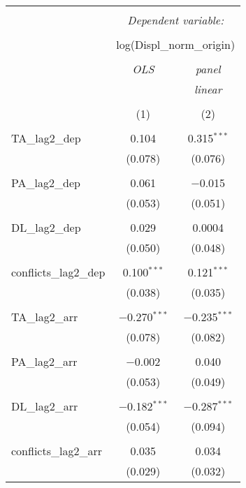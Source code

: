 
\begin{table}[!htbp] \centering 
  \caption{} 
  \label{} 
\begin{tabular}{@{\extracolsep{5pt}}lcc} 
\\[-1.8ex]\hline 
\hline \\[-1.8ex] 
 & \multicolumn{2}{c}{\textit{Dependent variable:}} \\ 
\cline{2-3} 
\\[-1.8ex] & \multicolumn{2}{c}{log(Displ\_norm\_origin)} \\ 
\\[-1.8ex] & \textit{OLS} & \textit{panel} \\ 
 & \textit{} & \textit{linear} \\ 
\\[-1.8ex] & (1) & (2)\\ 
\hline \\[-1.8ex] 
 TA\_lag2\_dep & 0.104 & 0.315$^{***}$ \\ 
  & (0.078) & (0.076) \\ 
  & & \\ 
 PA\_lag2\_dep & 0.061 & $-$0.015 \\ 
  & (0.053) & (0.051) \\ 
  & & \\ 
 DL\_lag2\_dep & 0.029 & 0.0004 \\ 
  & (0.050) & (0.048) \\ 
  & & \\ 
 conflicts\_lag2\_dep & 0.100$^{***}$ & 0.121$^{***}$ \\ 
  & (0.038) & (0.035) \\ 
  & & \\ 
 TA\_lag2\_arr & $-$0.270$^{***}$ & $-$0.235$^{***}$ \\ 
  & (0.078) & (0.082) \\ 
  & & \\ 
 PA\_lag2\_arr & $-$0.002 & 0.040 \\ 
  & (0.053) & (0.049) \\ 
  & & \\ 
 DL\_lag2\_arr & $-$0.182$^{***}$ & $-$0.287$^{***}$ \\ 
  & (0.054) & (0.094) \\ 
  & & \\ 
 conflicts\_lag2\_arr & 0.035 & 0.034 \\ 
  & (0.029) & (0.032) \\ 

\end{tabular}
\end{table}
